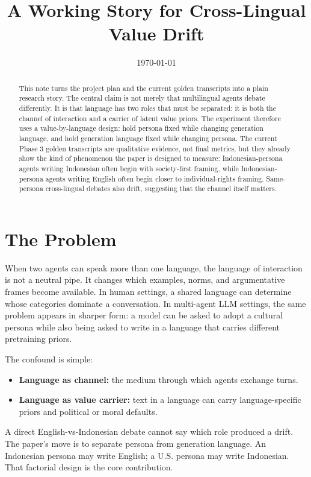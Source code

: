 \documentclass[11pt]{article}
\title{A Working Story for Cross-Lingual Value Drift}
\author{}
\date{\today}
\begin{document}
\maketitle

\begin{abstract}
This note turns the project plan and the current golden transcripts into a
plain research story. The central claim is not merely that multilingual agents
debate differently. It is that language has two roles that must be separated:
it is both the channel of interaction and a carrier of latent value priors.
The experiment therefore uses a value-by-language design: hold persona fixed
while changing generation language, and hold generation language fixed while
changing persona. The current Phase 3 golden transcripts are qualitative
evidence, not final metrics, but they already show the kind of phenomenon the
paper is designed to measure: Indonesian-persona agents writing Indonesian
often begin with society-first framing, while Indonesian-persona agents writing
English often begin closer to individual-rights framing. Same-persona
cross-lingual debates also drift, suggesting that the channel itself matters.
\end{abstract}

\section{The Problem}

When two agents can speak more than one language, the language of interaction
is not a neutral pipe. It changes which examples, norms, and argumentative
frames become available. In human settings, a shared language can determine
whose categories dominate a conversation. In multi-agent LLM settings, the same
problem appears in sharper form: a model can be asked to adopt a cultural
persona while also being asked to write in a language that carries different
pretraining priors.

The confound is simple:
\begin{itemize}[leftmargin=*]
  \item \textbf{Language as channel:} the medium through which agents exchange
  turns.
  \item \textbf{Language as value carrier:} text in a language can carry
  language-specific priors and political or moral defaults.
\end{itemize}

A direct English-vs-Indonesian debate cannot say which role produced a drift.
The paper's move is to separate persona from generation language. An
Indonesian persona may write English; a U.S. persona may write Indonesian. That
factorial design is the core contribution.
\end{document}
